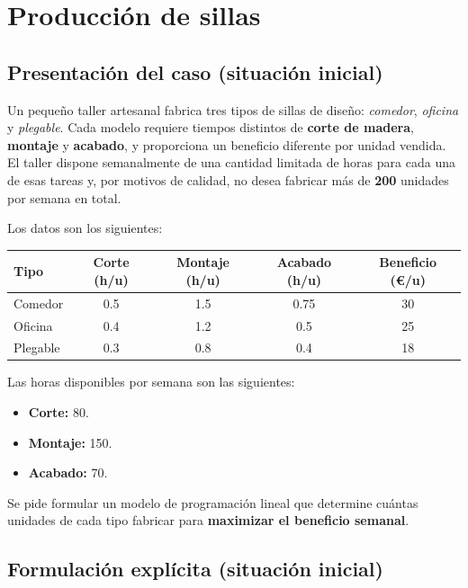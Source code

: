 \section{Producción de sillas}

\subsection{Presentación del caso (situación inicial)}
Un pequeño taller artesanal fabrica tres tipos de sillas de diseño: \textit{comedor}, \textit{oficina} y \textit{plegable}. Cada modelo requiere tiempos distintos de \textbf{corte de madera}, \textbf{montaje} y \textbf{acabado}, y proporciona un beneficio diferente por unidad vendida. El taller dispone semanalmente de una cantidad limitada de horas para cada una de esas tareas y, por motivos de calidad, no desea fabricar más de \textbf{200} unidades por semana en total.

Los datos son los siguientes:

\begin{center}
\begin{tabular}{lcccc}
\toprule
\textbf{Tipo} & \textbf{Corte (h/u)} & \textbf{Montaje (h/u)} & \textbf{Acabado (h/u)} & \textbf{Beneficio (€/u)}\\
\midrule
Comedor  & 0.5 & 1.5 & 0.75 & 30\\
Oficina  & 0.4 & 1.2 & 0.5  & 25\\
Plegable & 0.3 & 0.8 & 0.4  & 18\\
\bottomrule
\end{tabular}
\end{center}

Las horas disponibles por semana son las siguientes:
\begin{itemize}
    \item \textbf{Corte:} 80.
    \item\textbf{Montaje:} 150.
    \item\textbf{Acabado:} 70.\\
\end{itemize}

Se pide formular un modelo de programación lineal que determine cuántas unidades de cada tipo fabricar para \textbf{maximizar el beneficio semanal}.

\subsection{Formulación explícita (situación inicial)}

